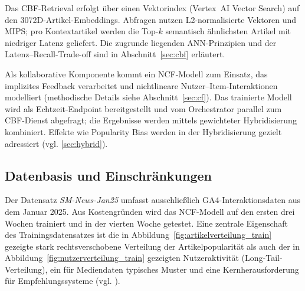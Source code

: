 \label{sec:cbf_service}
Das \ac{CBF}-Retrieval erfolgt über einen Vektorindex (Vertex~AI Vector Search) auf den 
3072D-Artikel-Embeddings. Abfragen nutzen L2-normalisierte Vektoren und \ac{MIPS}; 
pro Kontextartikel werden die Top-$k$ semantisch ähnlichsten Artikel mit niedriger Latenz 
geliefert. Die zugrunde liegenden \ac{ANN}-Prinzipien und der Latenz–Recall-Trade-off 
sind in Abschnitt~\ref{sec:cbf} erläutert.

\label{sec:ncf_service}
Als kollaborative Komponente kommt ein \ac{NCF}-Modell zum Einsatz, 
das implizites Feedback verarbeitet und nichtlineare 
Nutzer–Item-Interaktionen modelliert (methodische Details siehe Abschnitt~\ref{sec:cf}). 
Das trainierte Modell wird als Echtzeit-Endpoint bereitgestellt und vom 
Orchestrator parallel zum \ac{CBF}-Dienst abgefragt; die Ergebnisse werden mittels 
gewichteter Hybridisierung kombiniert. Effekte wie Popularity Bias werden in der 
Hybridisierung gezielt adressiert (vgl. \ref{sec:hybrid}).

\subsection{Datenbasis und Einschränkungen}
\label{sec:data}
Der Datensatz \textit{SM-News-Jan25} umfasst ausschließlich \ac{GA4}-Interaktionsdaten aus dem Januar 2025. 
Aus Kostengründen wird das NCF-Modell auf den ersten drei Wochen trainiert und in der vierten Woche getestet. 
Eine zentrale Eigenschaft des Trainingsdatensatzes ist die in Abbildung~\ref{fig:artikelverteilung_train} gezeigte stark 
rechtsverschobene Verteilung der Artikelpopularität als auch der in Abbildung~\ref{fig:nutzerverteilung_train}
gezeigten Nutzeraktivität (Long-Tail-Verteilung), ein für Mediendaten typisches Muster und eine Kernherausforderung für 
Empfehlungssysteme (vgl. \cite{wu_personalized_2022, raza_news_2020}).


